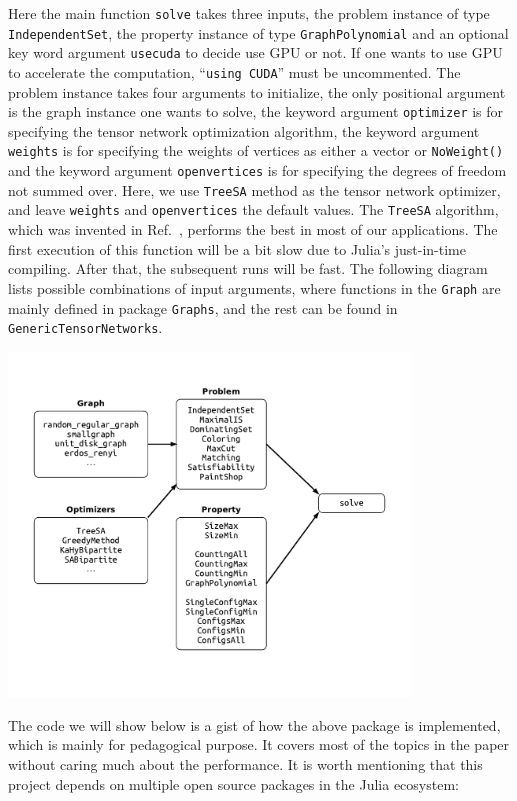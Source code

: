 \documentclass[onefignum, onetabnum]{siamart190516}
\newcommand{\<}{\langle}
\renewcommand{\>}{\rangle}
\begin{document}
Here the main function \texttt{solve} takes three inputs, the problem instance of type \texttt{IndependentSet}, the property instance of type \texttt{GraphPolynomial} and an optional key word argument \texttt{usecuda} to decide use GPU or not.
If one wants to use GPU to accelerate the computation, ``\texttt{using CUDA}'' must be uncommented.
The problem instance takes four arguments to initialize, the only positional argument is the graph instance one wants to solve, the keyword argument \texttt{optimizer} is for specifying the tensor network optimization algorithm, the keyword argument \texttt{weights} is for specifying the weights of vertices as either a vector or \texttt{NoWeight()} and the keyword argument \texttt{openvertices} is for specifying the degrees of freedom not summed over.
Here, we use \texttt{TreeSA} method as the tensor network optimizer, and leave \texttt{weights} and \texttt{openvertices} the default values. The \texttt{TreeSA} algorithm, which was invented in Ref.~\cite{Kalachev2021}, performs the best in most of our applications.
The first execution of this function will be a bit slow due to Julia's just-in-time compiling.
After that, the subsequent runs will be fast.
The following diagram lists possible combinations of input arguments, where functions in the \texttt{Graph} are mainly defined in package \texttt{Graphs}, and the rest can be found in \texttt{GenericTensorNetworks}.

\centerline{\includegraphics[width=0.8\textwidth, trim={0cm 1cm 0cm 1cm}, clip]{figures/fig7.pdf}}

The code we will show below is a gist of how the above package is implemented, which is mainly for pedagogical purpose.
It covers most of the topics in the paper without caring much about the performance.
It is worth mentioning that this project depends on multiple open source packages in the Julia ecosystem:
\end{document}
